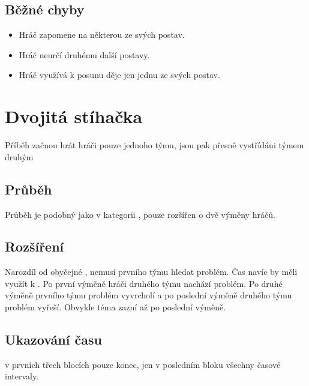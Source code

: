 \documentclass[main.tex]{subfiles}
\begin{document}
\subsection{ Běžné chyby } \begin{itemize}
\item  Hráč zapomene na některou ze svých postav.
\item  Hráč neurčí druhému další postavy.
\item  Hráč využívá k posunu děje jen jednu ze svých postav.
\end{itemize}
 
 
 
 
 
 
 
 
\needspace{5cm} \section{Dvojitá stíhačka} \label{dvojitá stíhačka}  
 
Příběh začnou hrát hráči pouze jednoho týmu, jsou pak přesně vystřídáni týmem druhým  
 
\subsection{ Průběh } Průběh je podobný jako v kategorii , pouze rozšířen o dvě výměny hráčů. 
 
\subsection{ Rozšíření } Narozdíl od obyčejné , nemusí  prvního týmu hledat problém. Čas navíc by měli využít k . Po první výměně hráči druhého týmu nachází problém. Po druhé výměně  prvního týmu problém vyvrcholí a po poslední výměně  druhého týmu problém vyřeší. Obvykle téma zazní až po poslední výměně. 
 
\subsection{ Ukazování času }   v prvních třech blocích pouze konec, jen v posledním bloku všechny časové intervaly. 
 
 
 
 
 
\end{document}
